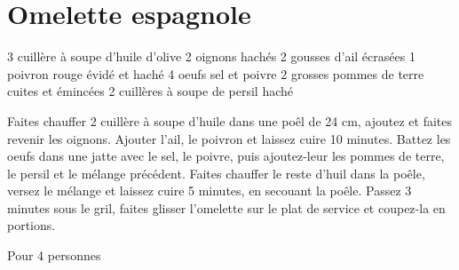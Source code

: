 \documentclass[10pt,a4paper]{recettes}
\begin{document}
    \maketitle

    \tableofcontents

    \section{Omelette espagnole}
    3 cuillère à soupe d'huile d'olive
    2 oignons hachés
    2 gousses d'ail écrasées
    1 poivron rouge évidé et haché
    4 oeufs
    sel et poivre
    2 grosses pommes de terre cuites et émincées
    2 cuillères à soupe de persil haché

    Faites chauffer 2 cuillère à soupe d'huile dans une poêl de 24 cm, ajoutez et faites revenir les oignons. Ajouter l'ail, le poivron et laissez cuire 10 minutes.
    Battez les oeufs dans une jatte avec le sel, le poivre, puis ajoutez-leur les pommes de terre, le persil et le mélange précédent.
    Faites chauffer le reste d'huil dans la poêle, versez le mélange et laissez cuire 5 minutes, en secouant la poêle.
    Passez 3 minutes sous le gril, faites glisser l'omelette sur le plat de service et coupez-la en portions.

    Pour 4 personnes
\end{document}
